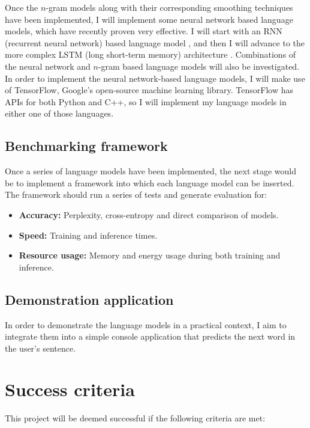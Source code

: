 \documentclass[a4paper, 12pt]{article}
\newcommand{\tbf}[1]{\textbf{#1}}
\begin{document}
\noindent
Once the $n$-gram models along with their corresponding smoothing techniques have been implemented, I will implement some neural network based language models, which have recently proven very effective. I will start with an RNN (recurrent neural network) based language model \cite{mikolov}, and then I will advance to the more complex LSTM (long short-term memory) architecture \cite{lstm}. Combinations of the neural network and $n$-gram based language models will also be investigated. \\

\noindent
In order to implement the neural network-based language models, I will make use of TensorFlow, Google's open-source machine learning library. TensorFlow has APIs for both Python and C++, so I will implement my language models in either one of those languages.

\subsection*{Benchmarking framework}
Once a series of language models have been implemented, the next stage would be to implement a framework into which each language model can be inserted. The framework should run a series of tests and generate evaluation for:
\begin{itemize}
\item
	\tbf{Accuracy:} Perplexity, cross-entropy and direct comparison of models.
\item
	\tbf{Speed:} Training and inference times.
\item
	\tbf{Resource usage:} Memory and energy usage during both training and inference.
\end{itemize}

\subsection*{Demonstration application}
In order to demonstrate the language models in a practical context, I aim to integrate them into a simple console application that predicts the next word in the user's sentence.

\section*{Success criteria}

This project will be deemed successful if the following criteria are met:
\end{document}
